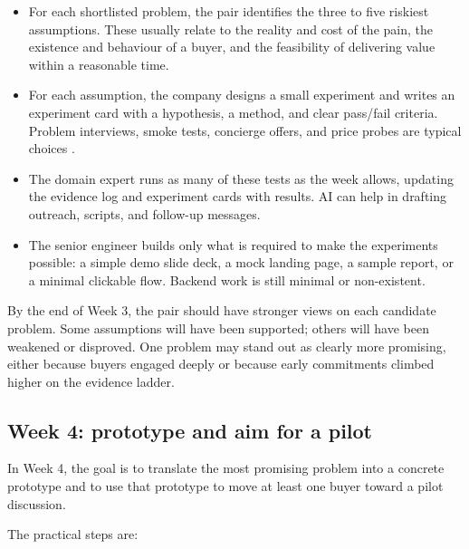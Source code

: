 \documentclass[10pt, a4paper, twocolumn]{article} %
\begin{document}
\begin{itemize}
  \item For each shortlisted problem, the pair identifies the three to five riskiest assumptions. These usually relate to the reality and cost of the pain, the existence and behaviour of a buyer, and the feasibility of delivering value within a reasonable time.
  \item For each assumption, the company designs a small experiment and writes an experiment card with a hypothesis, a method, and clear pass/fail criteria. Problem interviews, smoke tests, concierge offers, and price probes are typical choices \citep{ries2011lean,bland2019testing}.
  \item The domain expert runs as many of these tests as the week allows, updating the evidence log and experiment cards with results. AI can help in drafting outreach, scripts, and follow-up messages.
  \item The senior engineer builds only what is required to make the experiments possible: a simple demo slide deck, a mock landing page, a sample report, or a minimal clickable flow. Backend work is still minimal or non-existent.
\end{itemize}

By the end of Week 3, the pair should have stronger views on each candidate problem. Some assumptions will have been supported; others will have been weakened or disproved. One problem may stand out as clearly more promising, either because buyers engaged deeply or because early commitments climbed higher on the evidence ladder.

\newpage
\subsection{Week 4: prototype and aim for a pilot}

In Week 4, the goal is to translate the most promising problem into a concrete prototype and to use that prototype to move at least one buyer toward a pilot discussion.

The practical steps are:
\end{document}
